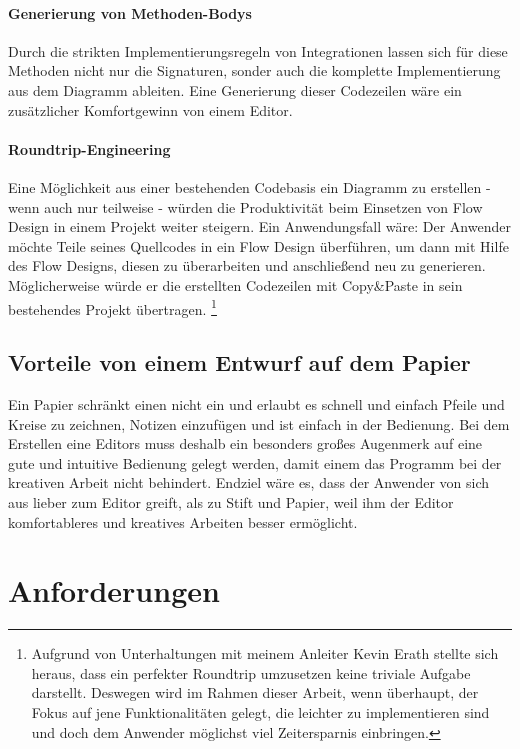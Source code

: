 \subsubsection{Generierung von Methoden-Bodys}

Durch die strikten Implementierungsregeln von Integrationen lassen sich für
diese Methoden nicht nur die Signaturen, sonder auch die komplette Implementierung aus dem Diagramm
ableiten. Eine Generierung dieser Codezeilen wäre ein zusätzlicher Komfortgewinn von einem Editor.
\subsubsection{Roundtrip-Engineering}

Eine Möglichkeit aus einer bestehenden Codebasis ein Diagramm zu erstellen -
wenn auch nur teilweise - würden die Produktivität beim Einsetzen von Flow
Design in einem Projekt weiter steigern.
Ein Anwendungsfall wäre: Der Anwender möchte
Teile seines Quellcodes in ein Flow Design überführen, um dann mit Hilfe des
Flow Designs, diesen zu überarbeiten und anschließend neu zu generieren.
Möglicherweise würde er die erstellten Codezeilen mit Copy\&Paste in sein
bestehendes Projekt übertragen.
\footnote{Aufgrund von Unterhaltungen mit meinem
Anleiter Kevin Erath stellte sich heraus, dass ein perfekter Roundtrip umzusetzen keine triviale Aufgabe
darstellt. Deswegen wird im Rahmen dieser Arbeit, wenn überhaupt, der Fokus auf jene Funktionalitäten
gelegt, die leichter zu implementieren sind und doch dem Anwender möglichst viel
Zeitersparnis einbringen.}

\section{Vorteile von einem Entwurf auf dem Papier}

Ein Papier schränkt einen nicht ein und erlaubt es schnell und einfach Pfeile
und Kreise zu zeichnen, Notizen einzufügen und ist einfach in der Bedienung.
Bei dem Erstellen eine Editors muss deshalb ein besonders großes Augenmerk auf
eine gute und intuitive Bedienung gelegt werden, damit einem das Programm bei der kreativen Arbeit nicht
behindert. Endziel wäre es, dass der Anwender von sich aus lieber zum Editor
greift, als zu Stift und Papier, weil ihm der Editor komfortableres und
kreatives Arbeiten besser ermöglicht.

\chapter{Anforderungen}

